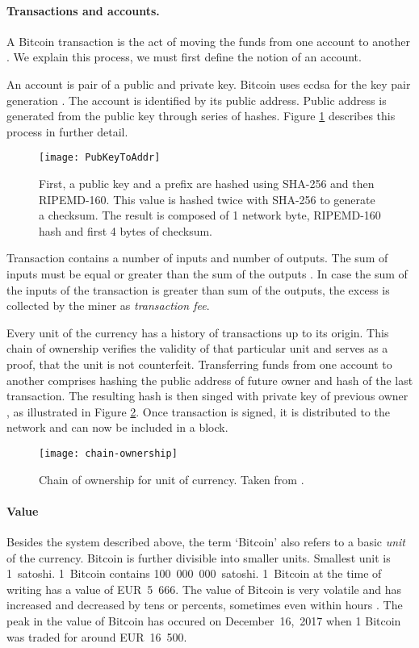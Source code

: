 \paragraph{Transactions and accounts.}
A Bitcoin transaction is the act of moving the funds from one account to another \cite{Judmayer2017BlocksMechanisms}. We explain this process, we must first define the notion of an account.

An account is pair of a public and private key. Bitcoin uses \acrfull{ecdsa} for the key pair generation \cite{Decker2013InformationNetwork}. The account is identified by its public address. Public address is generated from the public key through series of hashes. Figure \ref{fig:public-address-gen} describes this process in further detail.
% 
\begin{figure}[p]
    \centering
    \texttt{[image: PubKeyToAddr]}
    \caption{First, a public key and a prefix are hashed using SHA-256 and then RIPEMD-160. This value is hashed twice with SHA-256 to generate a checksum. The result is composed of 1 network byte, RIPEMD-160 hash and first 4 bytes of checksum.}
    \label{fig:public-address-gen}
\end{figure}

Transaction contains a number of inputs and number of outputs. The sum of inputs must be equal or greater than the sum of the outputs \cite[p. 27]{Judmayer2017BlocksMechanisms}. In case the sum of the inputs of the transaction is greater than sum of the outputs, the excess is collected by the miner as \textit{transaction fee}.

Every unit of the currency has a history of transactions up to its origin. This chain of ownership verifies the validity of that particular unit and serves as a proof, that the unit is not counterfeit. Transferring funds from one account to another comprises hashing the public address of future owner and hash of the last transaction. The resulting hash is then singed with private key of previous owner \cite{NakamotoBitcoin:System}, as illustrated in Figure \ref{fig:chain-ownership}. Once transaction is signed, it is distributed to the network and can now be included in a block.
% 
\begin{figure}[ht]
    \centering
    \texttt{[image: chain-ownership]}
    \caption{Chain of ownership for unit of currency. Taken from \cite{NakamotoBitcoin:System}.}
    \label{fig:chain-ownership}
\end{figure}

\paragraph{Value}
Besides the system described above, the term `Bitcoin' also refers to a basic \textit{unit} of the currency. Bitcoin is further divisible into smaller units. Smallest unit is 1~satoshi. 1~Bitcoin contains 100~000~000~satoshi. 1~Bitcoin at the time of writing has a value of EUR~5~666. The value of Bitcoin is very volatile and has increased and decreased by tens or percents, sometimes even within hours \cite{Adkisson2018WhyVolatile}. The peak in the value of Bitcoin has occured on December~16,~2017 when 1 Bitcoin was traded for around EUR~16~500.

